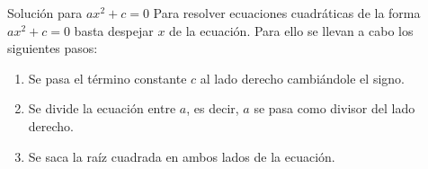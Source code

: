 \begin{infocard}{Solución para $ax^2+c=0$}
    Para resolver ecuaciones cuadráticas de la forma $ax^2+c=0$ basta despejar $x$ de la ecuación. Para ello se llevan a cabo los siguientes pasos:
    \begin{enumerate}
        \item Se pasa el término constante $c$ al lado derecho cambiándole el signo.
        \item Se divide la ecuación entre $a$, es decir, $a$ se pasa como divisor del lado derecho.
        \item Se saca la raíz cuadrada en ambos lados de la ecuación.
    \end{enumerate}
\end{infocard}